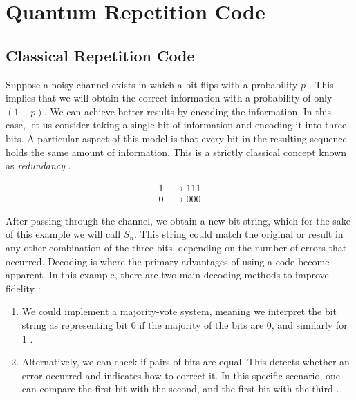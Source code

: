 \chapter{Quantum Repetition Code}\label{ch:quantum_repetition}

\section{Classical Repetition Code}
\label{sec:classical_repetition_code}

Suppose a noisy channel exists in which a bit flips with a probability $p$ \citep{Nielsen2010}. This implies that we will obtain the correct information with a probability of only $(1 - p)$. We can achieve better results by encoding the information. In this case, let us consider taking a single bit of information and encoding it into three bits. A particular aspect of this model is that every bit in the resulting sequence holds the same amount of information. This is a strictly classical concept known as \textit{redundancy} \citep{Nielsen2010}.

\begin{equation}
  \begin{aligned}
    1 &\to 111\\
    0 &\to 000
  \end{aligned}
  \label{img_1}
\end{equation}

After passing through the channel, we obtain a new bit string, which for the sake of this example we will call $S_n$. This string could match the original or result in any other combination of the three bits, depending on the number of errors that occurred. Decoding is where the primary advantages of using a code become apparent. In this example, there are two main decoding methods to improve fidelity \citep{Nielsen2010}:

\begin{enumerate}
\item We could implement a majority-vote system, meaning we interpret the bit string as representing bit 0 if the majority of the bits are 0, and similarly for 1 \citep{Nielsen2010}.
\item Alternatively, we can check if pairs of bits are equal. This detects whether an error occurred and indicates how to correct it. In this specific scenario, one can compare the first bit with the second, and the first bit with the third \citep{Nielsen2010}.
\end{enumerate}


